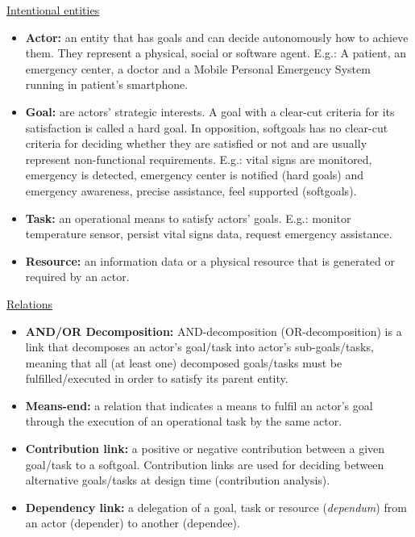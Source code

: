 \Large{\underline{Intentional entities}}
\normalsize
\begin{itemize}

\item \textbf{Actor:} an entity that has goals and can decide autonomously how to achieve them. They represent a physical, social or software agent. E.g.: A patient, an emergency center, a doctor and a Mobile Personal Emergency System running in patient's smartphone.
\medskip

\item \textbf{Goal:} are actors' strategic interests. A goal with a clear-cut criteria for its satisfaction is called a hard goal. In opposition, softgoals has no clear-cut criteria for deciding whether they are satisfied or not and are usually represent non-functional requirements. E.g.: vital signs are monitored, emergency is detected, emergency center is notified (hard goals) and emergency awareness, precise assistance, feel supported (softgoals).
\medskip

\item \textbf{Task:} an operational means to satisfy actors' goals. E.g.: monitor temperature sensor, persist vital signs data, request emergency assistance.
\medskip

\item \textbf{Resource:} an information data or a physical resource that is generated or required by an actor.

\end{itemize}
\medskip

\Large{\underline{Relations}}
\normalsize
\begin{itemize}

\item \textbf{AND/OR Decomposition:} AND-decomposition (OR-decomposition) is a link that decomposes an actor's goal/task into actor's sub-goals/tasks, meaning that all (at least one) decomposed goals/tasks must be fulfilled/executed in order to satisfy its parent entity. 
\medskip

\item \textbf{Means-end:} a relation that indicates a means to fulfil an actor's goal through the execution of an operational task by the same actor.
\medskip

\item \textbf{Contribution link:} a positive or negative contribution between a given goal/task to a softgoal. Contribution links are used for deciding between alternative goals/tasks at design time (contribution analysis).
\medskip

\item \textbf{Dependency link:} a delegation of a goal, task or resource (\textit{dependum}) from an actor (depender) to another (dependee).

\end{itemize}

